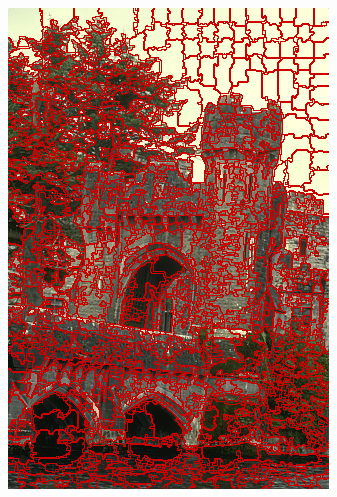 \begin{figure}
{		\includegraphics[scale=\scalefivebsdtest]{pictures/bsd-test-5-oriseeds}
	}
	\subfigure{
}
\end{figure}
